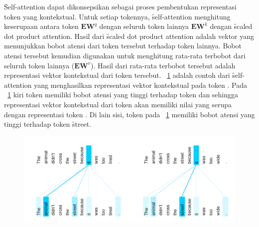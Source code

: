 	\f{Self-attention} dapat dikonsepsikan sebagai proses pembentukan representasi token yang kontekstual. Untuk setiap tokennya, \f{self-attention} menghitung keserupaan antara token $\mathbf{E}\mathbf{W}^q$ dengan seluruh token lainnya $\mathbf{E} \mathbf{W}^k$ dengan \f{scaled dot product attention}. Hasil dari \f{scaled dot product attention} adalah vektor yang menunjukkan bobot atensi dari token tersebut terhadap token lainnya. Bobot atensi tersebut kemudian digunakan untuk menghitung rata-rata terbobot dari seluruh token lainnya ($\mathbf{E} \mathbf{W}^v$). Hasil dari rata-rata terbobot tersebut adalah representasi vektor kontekstual dari token tersebut. \pic~\ref{fig:self-attention-example} adalah contoh dari \f{self-attention} yang menghasilkan representasi vektor kontekstual pada token . Pada \pic~\ref{fig:self-attention-example} kiri token  memiliki bobot atensi yang tinggi terhadap token dan  sehingga representasi vektor kontekstual dari token  akan memiliki nilai yang serupa dengan representasi token . Di lain sisi, token  pada \pic~\ref{fig:self-attention-example} memiliki bobot atensi yang tinggi terhadap token \f{street}.
	\begin{figure}
		\centering
		\includegraphics[width=1\textwidth]{assets/pics/self-attn-example.png}
		\label{fig:self-attention-example}
	\end{figure}
	
